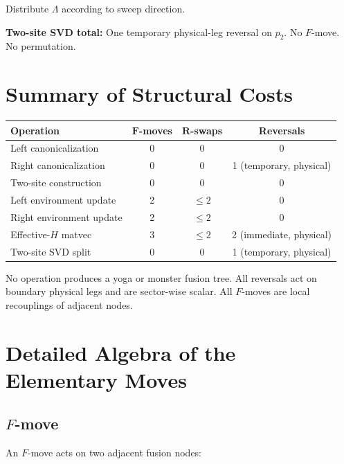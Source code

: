 \documentclass[11pt,a4paper]{article}
\begin{document}
Distribute $\Lambda$ according to sweep direction.

\begin{costbox}
\textbf{Two-site SVD total:}
One temporary physical-leg reversal on $p_2$.
No $F$-move. No permutation.
\end{costbox}


\section{Summary of Structural Costs}
\label{sec:summary}

\begin{center}
\renewcommand{\arraystretch}{1.3}
\begin{tabular}{l c c c}
\toprule
\textbf{Operation} & \textbf{$\boldsymbol{F}$-moves} & \textbf{$\boldsymbol{R}$-swaps} & \textbf{Reversals} \\
\midrule
Left canonicalization    & 0 & 0 & 0 \\
Right canonicalization   & 0 & 0 & 1 (temporary, physical) \\
Two-site construction    & 0 & 0 & 0 \\
Left environment update  & 2 & $\le 2$ & 0 \\
Right environment update & 2 & $\le 2$ & 0 \\
Effective-$H$ matvec     & 3 & $\le 2$ & 2 (immediate, physical) \\
Two-site SVD split       & 0 & 0 & 1 (temporary, physical) \\
\bottomrule
\end{tabular}
\end{center}

\medskip
\noindent
No operation produces a yoga or monster fusion tree.
All reversals act on boundary physical legs and are sector-wise scalar.
All $F$-moves are local recouplings of adjacent nodes.

\section{Detailed Algebra of the Elementary Moves}
\label{sec:algebra}

\subsection{$F$-move}

An $F$-move acts on two adjacent fusion nodes:
\end{document}

